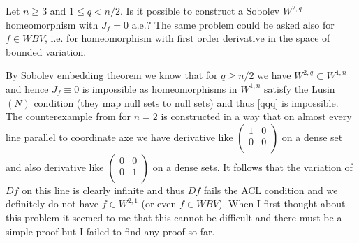 \documentclass[12pt,a4paper]{amsart}
\theoremstyle{plain}
\newtheorem{proclaim}[thm]{\the\prt}
\theoremstyle{definition}
\numberwithin{equation}{section}
\def\er{\mathbb R}
\newcounter{problem}
\begin{document}
 Let $n\geq 3$ and $1\leq q<n/2$. Is it possible to construct a Sobolev $W^{2,q}$ homeomorphism with 
$J_f=0$ a.e.? The same problem could be asked also for $f\in WBV$, i.e. for homeomorphism with first order derivative in the space of bounded variation. 

By Sobolev embedding theorem we know that for $q\geq n/2$ we have $W^{2,q}\subset W^{1,n}$ and hence $J_f\equiv 0$ is impossible as homeomorphisms in $W^{1,n}$ satisfy the Lusin $(N)$ condition (they map null sets to null sets) and thus \eqref{qqq} is impossible. The counterexample from \cite{H} for $n=2$ is constructed in a way that on almost every line parallel to coordinate axe we have derivative like  
$
\left( \begin{array}{cccc}
1&0\\
0&0 \\
\end{array} \right)
$
on a dense set and also derivative like
$
\left( \begin{array}{cccc}
0&0\\
0&1 \\
\end{array} \right)
$
on a dense sets. It follows that the variation of $Df$ on this line is clearly infinite and thus $Df$ fails the ACL condition and we definitely do not have $f\in W^{2,1}$ (or even $f\in WBV$). When I first thought about this problem it seemed to me that this cannot be difficult and there must be a simple proof but I failed to find any proof so far. 

\vskip 10pt



\end{document}
